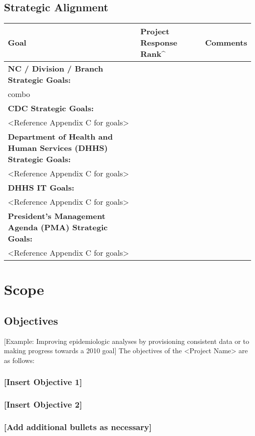 \documentclass[11pt]{article}
\begin{document}
\subsection{Strategic Alignment}
\label{sec:org568ddf2}
\begin{center}
\begin{tabular}{lll}
Goal & Project Response Rank\^{}\footnotemark & Comments\\
\hline
\textbf{NC / Division / Branch Strategic Goals:} &  & \\
combo &  & \\
\textbf{CDC Strategic Goals:} &  & \\
<Reference Appendix C for goals> &  & \\
\textbf{Department of Health and Human Services (DHHS) Strategic Goals:} &  & \\
<Reference Appendix C for goals> &  & \\
\textbf{DHHS IT Goals:} &  & \\
<Reference Appendix C for goals> &  & \\
\textbf{President’s Management Agenda (PMA) Strategic Goals:} &  & \\
<Reference Appendix C for goals> &  & \\
\end{tabular}
\end{center}

\section{Scope}
\label{sec:org81e634f}
\subsection{Objectives}
\label{sec:org894358e}
[Example: Improving epidemiologic analyses by provisioning consistent data or to making progress towards a 2010 goal]
The objectives of the <Project Name> are as follows:
\subsubsection{[Insert Objective 1]}
\label{sec:orgfbd9565}
\subsubsection{[Insert Objective 2]}
\label{sec:org6fddfa2}
\subsubsection{[Add additional bullets as necessary]}
\label{sec:org4f0fea7}
\end{document}
